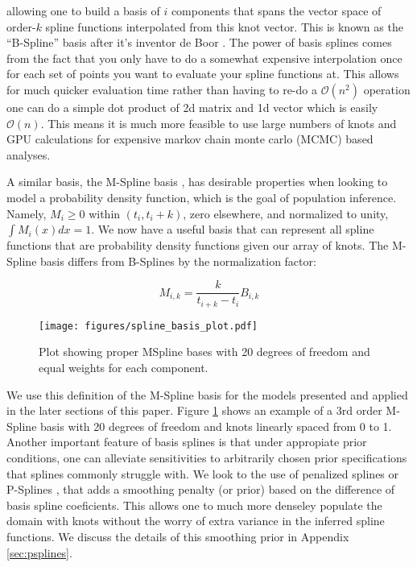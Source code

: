 \noindent allowing one to build a basis of $i$ components that spans the vector space of order-$k$ spline functions interpolated 
from this knot vector. This is known as the ``B-Spline'' basis after it's inventor de Boor . The power of basis splines
comes from the fact that you only have to do a somewhat expensive interpolation once for each set of points you want to evaluate your
spline functions at. This allows for much quicker evaluation time rather than having to re-do a  $\mathcal{O}(n^2)$
operation one can do a simple dot product of 2d matrix and 1d vector which is easily  $\mathcal{O}(n)$. This means it is much more feasible 
to use large numbers of knots and GPU calculations for expensive markov chain monte carlo (MCMC) based analyses.

A similar basis, the M-Spline basis , has desirable properties when looking to model a probability density function, which is the 
goal of population inference. Namely, $M_i \geq 0$ within $(t_i, t_i+k)$, zero elsewhere, and normalized to unity, $\int M_i(x)dx = 1$. We now have
a useful basis that can represent all spline functions that are probability density functions given our array of knots. The M-Spline basis differs 
from B-Splines by the normalization factor:

\begin{equation}\label{eq:MB_SplineRelation}
M_{i,k} = \frac{k}{t_{i+k} - t_i} B_{i,k}
\end{equation}

\begin{figure}[ht!]
        \texttt{[image: figures/spline\_basis\_plot.pdf]}
        \caption{Plot showing proper MSpline bases with 20 degrees of freedom and equal weights for each component.}
        \label{fig:spline_basis}
\end{figure}

\noindent We use this definition of the M-Spline basis for the models presented and applied in the later sections of this paper. 
Figure \ref{fig:spline_basis} shows an example of a 3rd order M-Spline basis with 20 degrees of freedom and knots linearly spaced from 0 to 1.
Another important feature of basis splines is that under appropiate prior conditions, one can alleviate sensitivities to arbitrarily 
chosen prior specifications that splines commonly struggle with. We look to the use of penalized splines or P-Splines , 
that adds a smoothing penalty (or prior) based on the difference of basis spline coeficients. This allows one to much more denseley populate
the domain with knots without the worry of extra variance in the inferred spline functions. We discuss the details of this smoothing prior 
in Appendix \ref{sec:psplines}.

